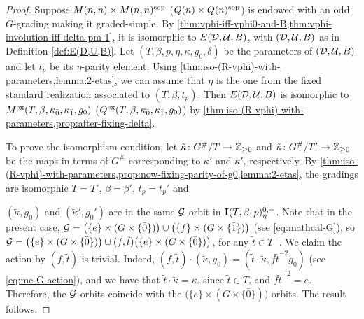 \begin{proof}
    Suppose $M(n,n) \times M(n,n)^{\mathrm{sop}}$ ($Q(n) \times Q(n)^{\mathrm{sop}}$) is endowed with an odd $G$-grading making it graded-simple. 
    By \cref{thm:vphi-iff-vphi0-and-B,thm:vphi-involution-iff-delta-pm-1}, it is isomorphic to $E(\mathcal{D}, \mathcal U, B)$, with $(\mathcal{D}, \mathcal U, B)$ as in Definition \ref{def:E(D,U,B)}. 
    Let $(T, \beta, p, \eta, \kappa, g_0, \delta)$ be the parameters of $(\mathcal{D}, \mathcal U, B)$ and let $t_p$ be its $\eta$-parity element. 
    Using \cref{thm:iso-(R-vphi)-with-parameters,lemma:2-etas}, we can assume that $\eta$ is the one from the fixed standard realization associated to $(T, \beta, t_p)$. 
    Then $E(\mathcal{D}, \mathcal U, B)$ is isomorphic to $M^{\mathrm{ex}} (T, \beta, \kappa_{\bar{0}}, \kappa_{\bar{1}}, g_0)$ ($Q^{\mathrm{ex}} (T, \beta, \kappa_{\bar{0}}, \kappa_{\bar{1}}, g_0)$) by \cref{thm:iso-(R-vphi)-with-parameters,prop:after-fixing-delta}. 
    
    To prove the isomorphism condition, let  $\tilde\kappa\colon G^\#/T \to \mathbb{Z}_{\geq 0}$ and  $\tilde\kappa\colon G^\#/T' \to \mathbb{Z}_{\geq 0}$ be the maps in terms of $G^\#$ corresponding to $\kappa'$ and $\kappa'$, respectively. 
    By \cref{thm:iso-(R-vphi)-with-parameters,prop:now-fixing-parity-of-g0,lemma:2-etas}, the gradings are isomorphic \IFF $T =T'$, $\beta = \beta'$, $t_p = t_p'$ and 
    
    $(\tilde\kappa, g_0)$ and $(\tilde\kappa', g_0')$ are in the same $\mathcal G$-orbit in $\mathbf{I}(T,\beta,p)^{{\bar{0}}, +}_\eta$. 
    Note that in the present case, $\mathcal G = \big( \{e\} \times (G \times \{ \bar 0 \}) \big) \cup \big( \{f\} \times (G \times \{ \bar 1 \}) \big)$ (see \cref{eq:mathcal-G}), so 
    $\mathcal G = \big( \{e\} \times (G \times \{ \bar 0 \}) \big) \cup (f, \tilde t)\big( \{e\} \times (G \times \{ \bar 0 \}) \big)$, for any $\tilde t \in T^-$. 
    We claim the action by $(f, \tilde t)$ is trivial. 
    Indeed, $(f, \tilde t) \cdot (\tilde\kappa, g_0) = (\tilde t \cdot \tilde\kappa, f \tilde t ^{-2} g_0)$ (see \cref{eq:mc-G-action}), and we have that $\tilde t \cdot \tilde\kappa = \kappa$, since $\tilde t \in T$, and $f \tilde t ^{-2} = e$. 
    Therefore, the $\mathcal G$-orbits coincide with the $\big( \{e\} \times (G \times \{ \bar 0 \}) \big)$ orbits. 
    The result follows. 
    

\end{proof}
